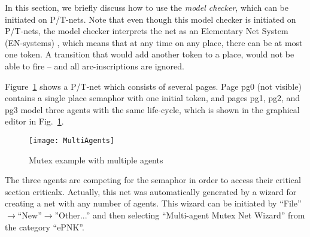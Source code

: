 In this section, we briefly discuss how to use the \emph{model checker}, which
can be initiated on P/T-nets. Note that even though this model checker
is initiated on P/T-nets, the model checker interprets the net as
an Elementary Net System (EN-systems) \cite{Thi87,Roz87}, which means
that at any time on any place, there can be at most one token.
A transition that would add another token to a place, would not be
able to fire -- and all arc-inscriptions are ignored.

Figure~\ref{fig:user:multi-agent} shows a P/T-net which consists
of several pages. Page {\sf pg0} (not visible) contains
a single place {\sf semaphor} with one initial token, and pages
{\sf pg1}, {\sf pg2}, and {\sf pg3} model three agents with the same
life-cycle, which is shown in the graphical editor in
Fig.~\ref{fig:user:multi-agent}.
%
\begin{figure}[hbt!!]
  \centerline{\texttt{[image: MultiAgents]}}
  \caption{Mutex example with multiple agents}
  \label{fig:user:multi-agent}
\end{figure}
%
The three agents are competing for the semaphor in order to
access their critical section {\sf criticalx}. Actually, this
net was automatically generated by a wizard for creating a net
with any number of agents. This wizard can be initiated by
``File''$\rightarrow$``New''$\rightarrow$''Other...'' and
then selecting ``Multi-agent Mutex Net Wizard'' from the 
category ``ePNK''. 

